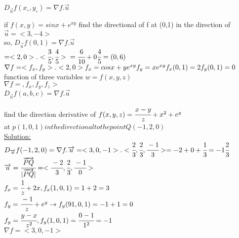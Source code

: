 \begin{theorem}
 $D_{\overrightarrow{u}} f(x_\circ,y_\circ) = \nabla f .{\overrightarrow{u}}$
\end{theorem}
\begin{example}
if $f(x,y) = sin x + e ^{xy}$ find the directional of f at (0,1) in the direction of ${\overrightarrow{u}} = <3,-4>$\\
so, $D_{\overrightarrow{u}} f(0,1)= \nabla f .{\overrightarrow{u}}$\\
$=<2,0> . <\cfrac{3}{5},\cfrac{4}{5}>\\
=\cfrac{6}{10} + 0\cfrac{4}{5} = (0,6)$\\
$\nabla f = <f_x,f_y> . <2,0>\\
f_x = cos x + y e^{xy} \\
f_y = x e^{xy} \\
f_x(0,1) = 2\\
f_y(0,1) = 0 $\\
function of three variables $w = f(x,y,z)$\\
$\nabla f = ,f_x,f_y,f_z>$\\
$D_{\overrightarrow{u}} f(a,b,c) = \nabla f . {\overrightarrow{u}}$\\
\end{example}
\noindent{\color{smalt(darkpowderblue)}\rule{\linewidth}{.2mm}}
\begin{example}
find the direction derivative of $f(x,y,z) = \cfrac{x - y}{z} + x^{2} + e^{y}$\\
at $p(1,0,1) in the directional to the point Q (-1,2,0)$\\
{\color{smalt(darkpowderblue)}\underline{Solution:}}\\ $D_{\overrightarrow{u}} f(-1,2,0) = \nabla f . {\overrightarrow{u}} = <3,0,-1>.<\cfrac{2}{3},\cfrac{2}{3},\cfrac{-1}{3}> = -2 + 0 + \cfrac{1}{3} = -1\cfrac{2}{3}$\\
${\overrightarrow{u}} = \cfrac{{\overrightarrow{PQ}}}{|{\overrightarrow{PQ}}|} = <\cfrac{-2}{3} , \cfrac{2}{3} , \cfrac{-1}{0}>$\\
$f_x = \cfrac{1}{z} + 2x , f_x(1,0,1) = 1+2 = 3$\\
$f_y = \cfrac{-1}{z} + e^{y} \rightarrow f_y(91,0,1) = -1 +1 = 0 $\\
$f_y = \cfrac{y-x}{z^{2}} , f_y(1,0,1) = \cfrac{0-1}{1^{2}} = -1 $\\
$\nabla f = <3,0,-1>$\\
\end{example}
